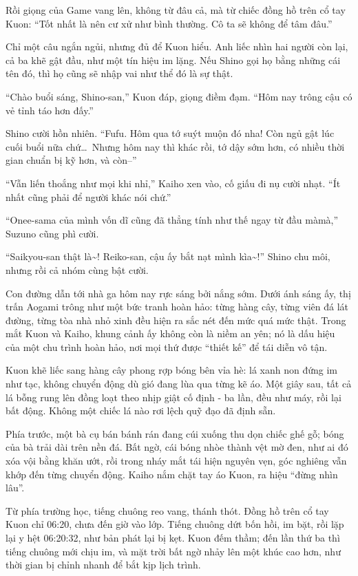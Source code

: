 \documentclass[../main.tex]{subfiles}
\begin{document}
Rồi giọng của Game vang lên, không từ đâu cả, mà từ chiếc đồng hồ trên cổ tay Kuon: ``Tốt nhất là nên cư xử như bình thường. Cô ta sẽ không để tâm đâu.''

Chỉ một câu ngắn ngủi, nhưng đủ để Kuon hiểu. Anh liếc nhìn hai người còn lại, cả ba khẽ gật đầu, như một tín hiệu im lặng. Nếu Shino gọi họ bằng những cái tên đó, thì họ cũng sẽ nhập vai như thể đó là sự thật.

``Chào buổi sáng, Shino-san,'' Kuon đáp, giọng điềm đạm. ``Hôm nay trông cậu có vẻ tỉnh táo hơn đấy.''

Shino cười hồn nhiên. ``Fufu. Hôm qua tớ suýt muộn đó nha! Còn ngủ gật lúc cuối buổi nữa chứ\dots\ Nhưng hôm nay thì khác rồi, tớ dậy sớm hơn, có nhiều thời gian chuẩn bị kỹ hơn, và còn--''

``Vẫn liến thoắng như mọi khi nhỉ,'' Kaiho xen vào, cố giấu đi nụ cười nhạt. ``Ít nhất cũng phải để người khác nói chứ.''

``Onee-sama của mình vốn dĩ cũng đã thẳng tính như thế ngay từ đầu màmà,'' Suzuno cũng phì cười.

``Saikyou-san thật là\~{}! Reiko-san, cậu ấy bắt nạt mình kìa\~{}!'' Shino chu môi, nhưng rồi cả nhóm cùng bật cười.

Con đường dẫn tới nhà ga hôm nay rực sáng bởi nắng sớm. Dưới ánh sáng ấy, thị trấn Aogami trông như một bức tranh hoàn hảo: từng hàng cây, từng viên đá lát đường, từng tòa nhà nhỏ xinh đều hiện ra sắc nét đến mức quá mức thật. Trong mắt Kuon và Kaiho, khung cảnh ấy không còn là niềm an yên; nó là dấu hiệu của một chu trình hoàn hảo, nơi mọi thứ được ``thiết kế'' để tái diễn vô tận.

Kuon khẽ liếc sang hàng cây phong rợp bóng bên vỉa hè: lá xanh non đứng im như tạc, không chuyển động dù gió đang lùa qua từng kẽ áo. Một giây sau, tất cả lá bỗng rung lên đồng loạt theo nhịp giật cố định - ba lần, đều như máy, rồi lại bất động. Không một chiếc lá nào rơi lệch quỹ đạo đã định sẵn.

Phía trước, một bà cụ bán bánh rán đang cúi xuống thu dọn chiếc ghế gỗ; bóng của bà trải dài trên nền đá. Bất ngờ, cái bóng nhòe thành vệt mờ đen, như ai đó xóa vội bằng khăn ướt, rồi trong nháy mắt tái hiện nguyên vẹn, góc nghiêng vẫn khớp đến từng chuyển động. Kaiho nắm chặt tay áo Kuon, ra hiệu ``đừng nhìn lâu''.

Từ phía trường học, tiếng chuông reo vang, thánh thót. Đồng hồ trên cổ tay Kuon chỉ 06:20, chưa đến giờ vào lớp. Tiếng chuông dứt bốn hồi, im bặt, rồi lặp lại y hệt 06:20:32, như bản phát lại bị kẹt. Kuon đếm thầm; đến lần thứ ba thì tiếng chuông mới chịu im, và mặt trời bất ngờ nhảy lên một khúc cao hơn, như thời gian bị chỉnh nhanh để bắt kịp lịch trình.
\end{document}
